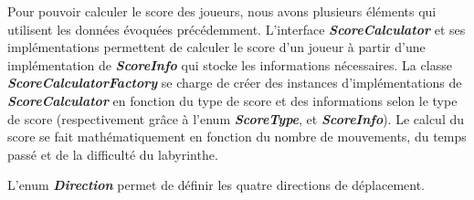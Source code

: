 Pour pouvoir calculer le score des joueurs, nous avons plusieurs éléments qui
utilisent les données évoquées précédemment. L'interface
\textbf{\textit{ScoreCalculator}} et ses implémentations permettent de calculer
le score d'un joueur à partir d'une implémentation de
\textbf{\textit{ScoreInfo}} qui stocke les informations nécessaires. La classe
\textbf{\textit{ScoreCalculatorFactory}} se charge de créer des instances
d'implémentations de \textbf{\textit{ScoreCalculator}} en fonction du type de
score et des informations selon le type de score (respectivement grâce à l'enum
\textbf{\textit{ScoreType}}, et \textbf{\textit{ScoreInfo}}). Le calcul du
score se fait mathématiquement en fonction du nombre de mouvements, du temps
passé et de la difficulté du labyrinthe.

L'enum \textbf{\textit{Direction}} permet de définir les quatre directions de
déplacement.
